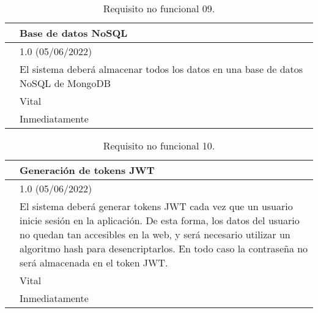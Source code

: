 \begin{table}[H]
\begin{center}
\begin{tabular}{|p{3cm}|p{10cm}|} \hline
\centering {\bf NFR-09} & Base de datos NoSQL  \\ \hline\hline
\centering {\bf Versión} & 1.0 (05/06/2022) \\ \hline
\centering {\bf Descripción} & El sistema deberá almacenar todos los datos en una base de datos NoSQL de MongoDB \cite{mongodb} \\ \hline
\centering {\bf Importancia} & Vital \\ \hline
\centering {\bf Urgencia} & Inmediatamente \\ \hline
\end{tabular}
\caption{Requisito no funcional 09.}
\label{enlaceNFR9}
\end{center}
\end{table}

\begin{table}[H]
\begin{center}
\begin{tabular}{|p{3cm}|p{10cm}|} \hline
\centering {\bf NFR-10} & Generación de tokens JWT  \\ \hline\hline
\centering {\bf Versión} & 1.0 (05/06/2022) \\ \hline
\centering {\bf Descripción} & El sistema deberá generar tokens JWT \cite{jwt} cada vez que un usuario inicie sesión en la aplicación. De esta forma, los datos del usuario no quedan tan accesibles en la web, y será necesario utilizar un algoritmo hash para desencriptarlos. En todo caso la contraseña no será almacenada en el token JWT. \\ \hline
\centering {\bf Importancia} & Vital \\ \hline
\centering {\bf Urgencia} & Inmediatamente \\ \hline
\end{tabular}
\caption{Requisito no funcional 10.}
\label{enlaceNFR10}
\end{center}
\end{table}